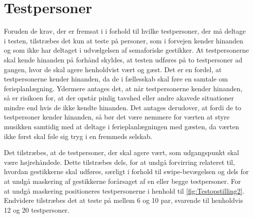 \section{Testpersoner}
\label{TestpersonerSocialAccept}
%
Foruden de krav, der er fremsat i  i forhold til hvilke testpersoner, der må deltage i testen, tilstræbes det kun at teste på personer, som i forvejen kender hinanden og som ikke har deltaget i udvælgelsen af semaforiske gestikker. At testpersonerne skal kende hinanden på forhånd skyldes, at testen udføres på to testpersoner ad gangen, hvor de skal agere henholdvist vært og gæst. Det er en fordel, at testpersonerne kender hinanden, da de i fællesskab skal føre en samtale om ferieplanlægning. Ydermere antages det, at når testpersonerne kender hinanden, så er risikoen for, at der opstår pinlig tavshed eller andre akavede situationer mindre end hvis de ikke kendte hinanden. Det antages derudover, at fordi de to testpersoner kender hinanden, så bør det være nemmere for værten at styre musikken samtidig med at deltage i ferieplanlægningen med gæsten, da værten ikke først skal føle sig tryg i en fremmeds selskab. 

Det tilstræbes, at de testpersoner, der skal agere vært, som udgangspunkt skal være højrehåndede. Dette tilstræbes dels, for at undgå forvirring relateret til, hvordan gestikkerne skal udføres, særligt i forhold til swipe-bevægelsen og dels for at undgå maskering af gestikkerne forårsaget af en eller begge testpersoner. For at undgå maskering positioneres testpersonerne i henhold til \autoref{fig:Testopstilling2}. Endvidere tilstræbes det at teste på mellem 6 og 10 par, svarende til henholdvis 12 og 20 testpersoner. 